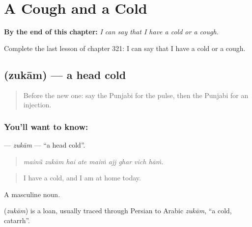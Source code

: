 
\chapter{A Cough and a Cold}
\label{ch:pa-a2-a-cough-and-a-cold}

\begin{chapteropening}
\textbf{By the end of this chapter:} \emph{I can say that I have a cold or a cough.}

Complete the last lesson of chapter 321: I can say that I have a cold or a cough.
\end{chapteropening}

\section[\texorpdfstring{\pa{ਜ਼ੁਕਾਮ} (zukām)}{ਜ਼ੁਕਾਮ (zukām)}]{ (zukām) — a head cold}

\label{lesson:PA-C321-zukam}



\begin{quote}
Before the new one: say the Punjabi for the pulse, then the Punjabi for an injection.
\end{quote}

\subsection*{You'll want to know: }
\textbf{} — \emph{zukām} — \textquotedblleft{}a head cold\textquotedblright{}.

\begin{quote}
        
\end{quote}

\begin{quote}
\emph{mainū̃ zukām hai ate maiṁ ajj ghar vich hāṁ.}
\end{quote}

\begin{quote}
I have a cold, and I am at home today.
\end{quote}

A masculine noun.

\begin{cousinweb}
\textbf{} (\emph{zukām}) is a loan, usually traced through Persian to Arabic \emph{zukām}, \textquotedblleft{}a cold, catarrh\textquotedblright{}.
\end{cousinweb}

